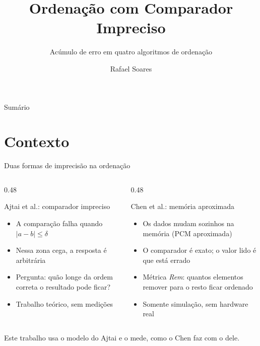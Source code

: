 \documentclass[aspectratio=169,10pt]{beamer}
\title[Comparador Impreciso]{Ordenação com Comparador Impreciso}
\subtitle{Acúmulo de erro em quatro algoritmos de ordenação}
\author[Rafael Soares]{Rafael Soares}
\institute[UFT]{Universidade Federal do Tocantins}
\date{}
\begin{document}
\begin{frame}
  \titlepage
\end{frame}

\begin{frame}{Sumário}
  \tableofcontents
\end{frame}

\section{Contexto}

\begin{frame}{Duas formas de imprecisão na ordenação}
  \begin{columns}[T]
    \begin{column}{0.48\textwidth}
      \begin{block}{Ajtai et al.: comparador impreciso}
        \begin{itemize}
          \item A \alert{comparação} falha quando $|a-b| \le \delta$
          \item Nessa zona cega, a resposta é arbitrária
          \item Pergunta: quão longe da ordem correta o resultado pode ficar?
          \item Trabalho teórico, sem medições
        \end{itemize}
      \end{block}
    \end{column}
    \begin{column}{0.48\textwidth}
      \begin{block}{Chen et al.: memória aproximada}
        \begin{itemize}
          \item Os \alert{dados} mudam sozinhos na memória (PCM aproximada)
          \item O comparador é exato; o valor lido é que está errado
          \item Métrica \emph{Rem}: quantos elementos remover para o resto ficar ordenado
          \item Somente simulação, sem hardware real
        \end{itemize}
      \end{block}
    \end{column}
  \end{columns}
  \vspace{0.8em}
  \begin{center}
    Este trabalho usa o \alert{modelo do Ajtai} e o \alert{mede}, como o Chen faz com o dele.
  \end{center}
\end{frame}
\end{document}
